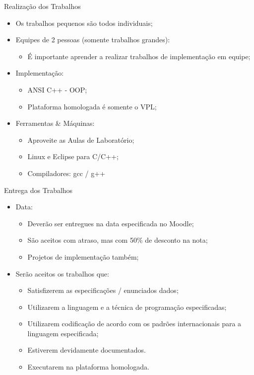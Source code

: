 \documentclass[12pt]{beamer}
\begin{document}
\begin{frame}{Realização dos Trabalhos}
\begin{itemize}
\item Os trabalhos pequenos são todos individuais;
\item Equipes de 2 pessoas (somente trabalhos grandes):
\begin{itemize}
\item É importante aprender a realizar trabalhos de implementação em equipe;
\end{itemize}
\item Implementação:
\begin{itemize}
\item ANSI C++ - OOP;
\item Plataforma homologada é somente o VPL;
\end{itemize}
\item Ferramentas \& Máquinas:
\begin{itemize}
\item Aproveite as Aulas de Laboratório;
\item Linux e Eclipse para C/C++;
\item Compiladores: gcc / g++
\end{itemize}
\end{itemize}
\end{frame}

\begin{frame}{Entrega dos Trabalhos}
\begin{itemize}
\item Data:
\begin{itemize}
\item Deverão ser entregues na data especificada no Moodle;
\item São aceitos com atraso, mas com 50\% de desconto na nota;
\item Projetos de implementação também;
\end{itemize}
\item Serão aceitos os trabalhos que:
\begin{itemize}
\item Satisfizerem as especificações / enunciados dados;
\item Utilizarem a linguagem e a técnica de programação especificadas;
\item Utilizarem codificação de acordo com os padrões internacionais para a linguagem especificada;
\item Estiverem devidamente documentados.
\item Executarem na plataforma homologada.
\end{itemize}
\end{itemize}
\end{frame}
\end{document}
